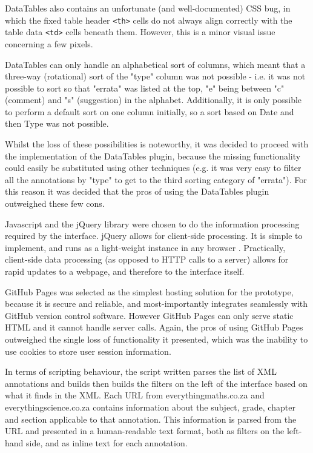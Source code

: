 DataTables also contains an unfortunate (and well-documented) CSS bug, in which the fixed table header \verb|<th>|                                                                                                                cells do not always align correctly with the table data \verb|<td>| cells beneath them. However, this is a minor visual issue concerning a few pixels.

DataTables can only handle an alphabetical sort of columns, which meant that a three-way (rotational) sort of the "type" column was not possible - i.e. it was not possible to sort so that "errata" was listed at the top, "e" being between "c" (comment) and "s" (suggestion) in the alphabet. Additionally, it is only possible to perform a default sort on one column initially, so a sort based on Date and then Type was not possible.

Whilst the loss of these possibilities is noteworthy, it was decided to proceed with the implementation of the DataTables plugin, because the missing functionality could easily be substituted using other techniques (e.g. it was very easy to filter all the annotations by "type" to get to the third sorting category of "errata"). For this reason it was decided that the pros of using the DataTables plugin outweighed these few cons.

Javascript and the jQuery library were chosen to do the information processing required by the interface. jQuery allows for client-side processing. It is simple to implement, and runs as a light-weight instance in any browser \citep{jQuery} \citep{JS}. Practically, client-side data processing (as opposed to HTTP calls to a server) allows for rapid updates to a webpage, and therefore to the interface itself. 

GitHub Pages was selected as the simplest hosting solution for the prototype, because it is secure and reliable, and most-importantly integrates seamlessly with GitHub version control software. However GitHub Pages can only serve static HTML and it cannot handle server calls. Again, the pros of using GitHub Pages outweighed the single loss of functionality it presented, which was the inability to use cookies to store user session information. 


In terms of scripting behaviour, the script written parses the list of XML annotations and builds then builds the filters on the left of the interface based on what it finds in the XML. Each URL from everythingmaths.co.za and everythingscience.co.za contains information about the subject, grade, chapter and section applicable to that annotation. This information is parsed from the URL and presented in a human-readable text format, both as filters on the left-hand side, and as inline text for each annotation. 

